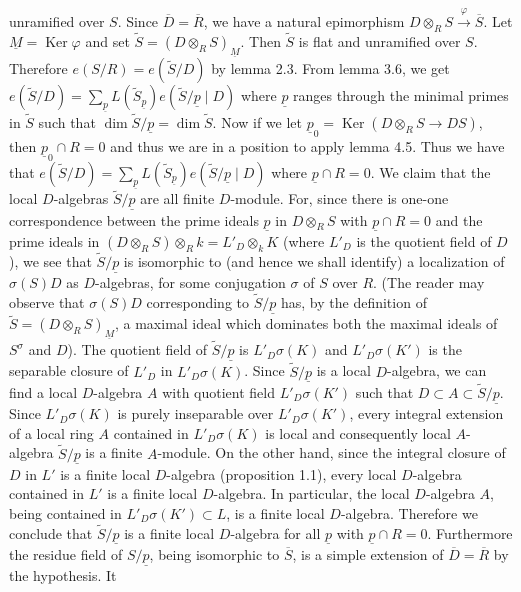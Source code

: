 unramified over $S$. Since $\overline D=\overline R$, we have a natural epimorphism $D\otimes_R S\xrightarrow{\varphi}\overline S$. Let $\underline M=\operatorname{Ker}\varphi$ and set $\widetilde S=(D\otimes_R S)_{\underline M}$. Then $\widetilde S$ is flat and unramified over $S$. Therefore $e(S/R)=e(\widetilde S/D)$ by lemma 2.3. From lemma 3.6, we get $e(\widetilde S/D)=\sum_{\underline p}L(\widetilde S_{\underline p})e(\widetilde S/\underline p\mid D)$ where $\underline p$ ranges through the minimal primes in $\widetilde S$ such that $\dim\widetilde S/\underline p=\dim\widetilde S$. Now if we let $\underline p_0=\operatorname{Ker}(D\otimes_R S\longrightarrow DS)$, then $\underline p_0\cap R=0$ and thus we are in a position to apply lemma 4.5. Thus we have that $e(\widetilde S/D)=\sum_{\underline p}L(\widetilde S_{\underline p})e(\widetilde S/\underline p\mid D)$ where $\underline p\cap R=0$. We claim that the local $D$-algebras $\widetilde S/\underline p$ are all finite $D$-module. For, since there is one-one correspondence between the prime ideals $\underline p$ in $D\otimes_R S$ with $\underline p\cap R=0$ and the prime ideals in $(D\otimes_R S)\otimes_R k=L'_D\otimes_k K$ (where $L'_D$ is the quotient field of $D$), we see that $\widetilde S/\underline p$ is isomorphic to (and hence we shall identify) a localization of $\sigma(S)D$ as $D$-algebras, for some conjugation $\sigma$ of $S$ over $R$. (The reader may observe that $\sigma(S)D$ corresponding to $\widetilde S/\underline p$ has, by the definition of $\widetilde S=(D\otimes_R S)_{\underline M}$, a maximal ideal which dominates both the maximal ideals of $S^\sigma$ and $D$). The quotient field of $\widetilde S/\underline p$ is $L'_D\sigma(K)$ and $L'_D\sigma(K')$ is the separable closure of $L'_D$ in $L'_D\sigma(K)$. Since $\widetilde S/\underline p$ is a local $D$-algebra, we can find a local $D$-algebra $A$ with quotient field $L'_D\sigma(K')$ such that $D\subset A\subset\widetilde S/\underline p$. Since $L'_D\sigma(K)$ is purely inseparable over $L'_D\sigma(K')$, every integral extension of a local ring $A$ contained in $L'_D\sigma(K)$ is local and consequently local $A$-algebra $\widetilde S/\underline p$ is a finite $A$-module. On the other hand, since the integral closure of $D$ in $L'$ is a finite local $D$-algebra (proposition 1.1), every local $D$-algebra contained in $L'$ is a finite local $D$-algebra. In particular, the local $D$-algebra $A$, being contained in $L'_D\sigma(K')\subset L$, is a finite local $D$-algebra. Therefore we conclude that $\widetilde S/\underline p$ is a finite local $D$-algebra for all $\underline p$ with $\underline p\cap R=0$. Furthermore the residue field of $S/\underline p$, being isomorphic to $\overline S$, is a simple extension of $\overline D=\overline R$ by the hypothesis. It
